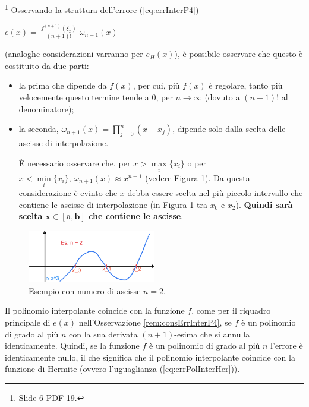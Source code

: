\begin{remark}\label{rem:consErrInterP4}\footnote{Slide 6 PDF 19.}
    Osservando la struttura dell'errore (\ref{eq:errInterP4})
    \begin{center}
        $e(x)=\,\boxed{\boxed{\frac{f^{(n+1)}(\xi_x)}{(n+1)!}}\;\boxed{\omega_{n+1}(x)}}$
    \end{center}
\end{remark}
(analoghe considerazioni varranno per $e_H(x)$), è possibile osservare che questo è costituito da due parti:
\begin{itemize}
    \item la prima che dipende da $\boxed{f(x)}$, per cui, più $f(x)$ è regolare, tanto più velocemente questo termine tende a 0, per $n\rightarrow\infty$ (dovuto a $(n+1)!$ al denominatore);
    \item la seconda, $\boxed{\omega_{n+1}(x)=\prod_{j=0}^n(x-x_j)}$, dipende solo dalla scelta delle ascisse di interpolazione.
    
    È necessario osservare che, per $x>\underset{i}{\max}\{x_i\}$ o per $x<\underset{i}{\min}\{x_i\},\, \omega_{n+1}(x)\approx x^{n+1}$ (vedere Figura \ref{fig:ossErrInterp}). Da questa considerazione è evinto che $x$ debba essere scelta nel più piccolo intervallo che contiene le ascisse di interpolazione (in Figura \ref{fig:ossErrInterp} tra $x_0$ e $x_2$). \textbf{Quindi sarà scelta $\boldsymbol{x\in [a,b]}$ che contiene le ascisse}.
\end{itemize}

\begin{figure}
    \centering
    \includegraphics[width=0.5\textwidth]{immagini/es. n=2.png}
    \caption{\label{fig:ossErrInterp} Esempio con numero di ascisse $n=2$.}
\end{figure}

Il polinomio interpolante coincide con la funzione $f$, come per il riquadro principale di $e(x)$ nell'Osservazione \ref{rem:consErrInterP4}, se $f$ è un polinomio di grado al più $n$ con la sua derivata $(n+1)$-esima che si annulla identicamente. Quindi, se la funzione $f$ è un polinomio di grado al più $n$ l'errore è identicamente nullo, il che significa che il polinomio interpolante coincide con la funzione di Hermite (ovvero l'uguaglianza (\ref{eq:errPolInterHer})).

